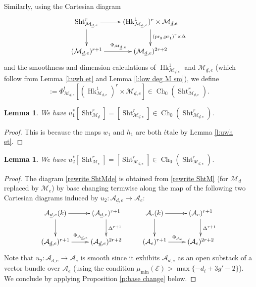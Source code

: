 \documentclass[reqno]{amsart}
\numberwithin{equation}{section}
\DeclareMathOperator{\Sht}{Sht}
\DeclareMathOperator{\pr}{pr}
\DeclareMathOperator{\Hk}{Hk}
\DeclareMathOperator{\Ch}{Ch}
\newcommand\un{\underline}
\newcommand\cA{\mathcal{A}}
\newcommand\cE{\mathcal{E}}
\newcommand\cM{\mathcal{M}}
\newtheorem{lemma}[thm]{Lemma}
\theoremstyle{remark}
\numberwithin{equation}{section}
\begin{document}
Similarly, using the Cartesian diagram
\begin{equation}\label{rewrite ShtMde}
\xymatrix{\Sht^{r}_{\cM_{\un d, e}}\ar[d]\ar[r] & (\Hk^{1}_{\cM_{\un d, e}})^{r}\ar[d]^{(\pr_{0},\pr_{1})^{r} \times \Delta} \times \cM_{\un d, e}\\
(\cM_{\un d ,e})^{r+1}\ar[r]^{\Phi_{\cM_{\un d,e}}} & (\cM_{\un d, e})^{2r+2}
}
\end{equation}
and the smoothness and dimension calculations of $\Hk^{1}_{\cM_{\un d,e}}$ and $\cM_{\un d, e}$ (which follow from Lemma \ref{l:uwh et} and Lemma \ref{l:low deg M sm}), we define
\begin{equation}
[\Sht^{r}_{\cM_{\un d, e}}]:=\Phi_{\cM_{\un d,e}}^{!}[(\Hk^{1}_{\cM_{\un d, e}})^{r} \times \cM_{\un d, e}]\in\Ch_{0}(\Sht^{r}_{\cM_{\un d ,e}}).
\end{equation}


\begin{lemma}\label{l:u1}
We have $u_{1}^{*}[\Sht^{r}_{\cM_{\un d}}]=[\Sht^{r}_{\cM_{\un d,e}}]\in \Ch_{0}(\Sht^{r}_{\cM_{\un d,e}})
$.
\end{lemma}
\begin{proof}
This is because the maps $w_{1}$ and $h_{1}$ are both \'etale by Lemma \ref{l:uwh et}.
\end{proof}


\begin{lemma}\label{l:u2}
We have $u_{2}^{*}[\Sht^{r}_{\cM_{e}}]=[\Sht^{r}_{\cM_{\un d,e}}]\in \Ch_{0}(\Sht^{r}_{\cM_{\un d,e}})
$.
\end{lemma}
\begin{proof}
The diagram \eqref{rewrite ShtMde} is obtained from \eqref{rewrite ShtM} (for $\cM_{d}$ replaced by $\cM_{e}$) by base changing termwise along the map of the following two Cartesian diagrams induced by $u_{2}: \cA_{\un d,e}\to \cA_{e}$:
\begin{equation}
\xymatrix{\cA_{\un d,e}(k)\ar[r]\ar[d] & (\cA_{\un d,e})^{r+1}\ar[d]^{\Delta^{r+1}}="a" & \cA_{e}(k)\ar[r] \ar[d]_{}="b" & (\cA_{e})^{r+1}\ar[d]^{\Delta^{r+1}}\\
(\cA_{\un d,e})^{r+1}\ar[r]^{\Phi_{\cA_{\un d,e}}} & (\cA_{\un d,e})^{2r+2} & (\cA_{e})^{r+1}\ar[r]^{\Phi_{\cA_{e}}} & (\cA_{e})^{2r+2}
}
\end{equation}
Note that $u_{2}: \cA_{\un d,e}\to \cA_{e}$ is smooth since it exhibits $\cA_{\un d,e}$ as an open substack of a vector bundle over $\cA_{e}$ (using the condition $\mu_{\min}(\cE)>\max\{-d_{i}+3g'-2\}$). We conclude by applying Proposition \ref{p:base change} below.
\end{proof}
\end{document}
